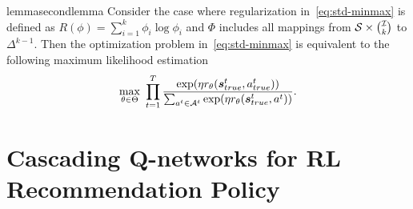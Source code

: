 \documentclass{article} %
\newcommand{\xc}[1]{{\color{blue}{\bf\sf #1}}}
\begin{document}
\begin{restatable}{lemma}{secondlemma}\label{lm2:mle}
Consider the case where regularization in~\eqref{eq:std-minmax} is defined as $R(\phi) = \sum_{i=1}^k \phi_i \log \phi_i$ and $\Phi$ includes all mappings from ${\mathcal{S}} \times {{\mathcal{I}}\choose k}$ to $\Delta^{k-1}$. Then the optimization problem in~\eqref{eq:std-minmax} is equivalent to the following maximum likelihood estimation
{\small \begin{equation}\label{eq:mle}
	\max_{\theta \in \Theta}~\prod_{t=1}^T \dfrac{\exp(\eta r_{\theta}({\bm{s}}_{true}^t, a^t_{true}))}{\sum_{a^t \in {\mathcal{A}}^t}\exp(\eta r_{\theta}({\bm{s}}_{true}^t, a^t))}.
\end{equation}}
 \end{restatable}
 

\vspace{-3mm}
\section{Cascading Q-networks for RL Recommendation Policy}
\vspace{-3mm}

\label{sec:rl_policy}
\end{document}
